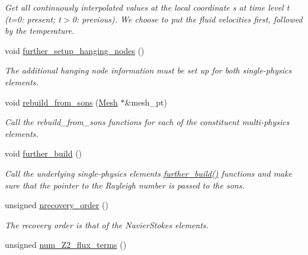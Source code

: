 \begin{DoxyCompactItemize}
\begin{DoxyCompactList}\small\item\em Get all continuously interpolated values at the local coordinate s at time level t (t=0\+: present; t$>$0\+: previous). We choose to put the fluid velocities first, followed by the temperature. \end{DoxyCompactList}\item 
void \hyperlink{classoomph_1_1RefineableBuoyantQCrouzeixRaviartElement_ab0a823598e014557e7d2ef2d533972d1}{further\+\_\+setup\+\_\+hanging\+\_\+nodes} ()
\begin{DoxyCompactList}\small\item\em The additional hanging node information must be set up for both single-\/physics elements. \end{DoxyCompactList}\item 
void \hyperlink{classoomph_1_1RefineableBuoyantQCrouzeixRaviartElement_a00e5ff46d718e47374a3d1dc282f419c}{rebuild\+\_\+from\+\_\+sons} (\hyperlink{classoomph_1_1Mesh}{Mesh} $\ast$\&mesh\+\_\+pt)
\begin{DoxyCompactList}\small\item\em Call the rebuild\+\_\+from\+\_\+sons functions for each of the constituent multi-\/physics elements. \end{DoxyCompactList}\item 
void \hyperlink{classoomph_1_1RefineableBuoyantQCrouzeixRaviartElement_a60d622f02595901b5f3ad830de915471}{further\+\_\+build} ()
\begin{DoxyCompactList}\small\item\em Call the underlying single-\/physics element\textquotesingle{}s \hyperlink{classoomph_1_1RefineableBuoyantQCrouzeixRaviartElement_a60d622f02595901b5f3ad830de915471}{further\+\_\+build()} functions and make sure that the pointer to the Rayleigh number is passed to the sons. \end{DoxyCompactList}\item 
unsigned \hyperlink{classoomph_1_1RefineableBuoyantQCrouzeixRaviartElement_a18e7035500add323a8d5ce921c9c1b8a}{nrecovery\+\_\+order} ()
\begin{DoxyCompactList}\small\item\em The recovery order is that of the Navier\+Stokes elements. \end{DoxyCompactList}\item 
unsigned \hyperlink{classoomph_1_1RefineableBuoyantQCrouzeixRaviartElement_a630b9aa6c5cf924d32996e89ed230175}{num\+\_\+\+Z2\+\_\+flux\+\_\+terms} ()

\end{DoxyCompactItemize}
